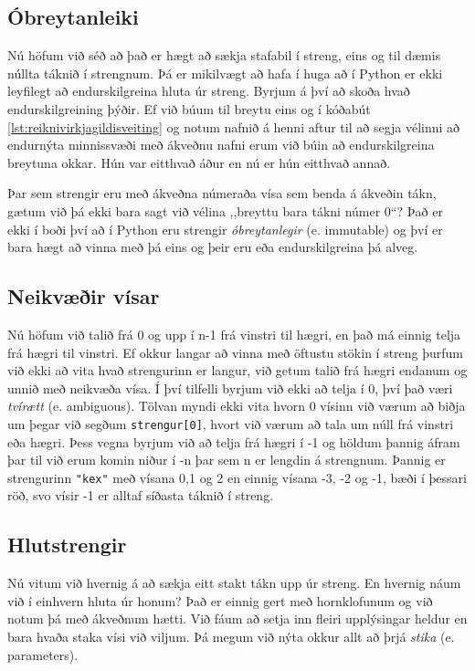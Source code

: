 \subsection{Óbreytanleiki}\label{uk:strengir-obreytanleiki}
Nú höfum við séð að það er hægt að sækja stafabil í streng, eins og til dæmis núllta táknið í strengnum.
Þá er mikilvægt að hafa í huga að í Python er ekki leyfilegt að endurskilgreina hluta úr streng.
Byrjum á því að skoða hvað endurskilgreining þýðir.
Ef við búum til breytu eins og í kóðabút \ref{lst:reiknivirkjagildisveiting} og notum nafnið á henni aftur til að segja vélinni að endurnýta minnissvæði með ákveðnu nafni erum við búin að endurskilgreina breytuna okkar.
Hún var eitthvað áður en nú er hún eitthvað annað.

Þar sem strengir eru með ákveðna númeraða vísa sem benda á ákveðin tákn, gætum við þá ekki bara sagt við vélina ,,breyttu bara tákni númer 0“?
Það er ekki í boði því að í Python eru strengir \emph{óbreytanlegir} (e. immutable) og því er bara hægt að vinna með þá eins og þeir eru eða endurskilgreina þá alveg.

\subsection{Neikvæðir vísar}
Nú höfum við talið frá 0 og upp í n-1 frá vinstri til hægri, en það má einnig telja frá hægri til vinstri.
Ef okkur langar að vinna með öftustu stökin í streng þurfum við ekki að vita hvað strengurinn er langur, við getum talið frá hægri endanum og unnið með neikvæða vísa.
Í því tilfelli byrjum við ekki að telja í 0, því það væri \emph{tvírætt} (e. ambiguous).
Tölvan myndi ekki vita hvorn 0 vísinn við værum að biðja um þegar við segðum \texttt{strengur[0]}, hvort við værum að tala um núll frá vinstri eða hægri.
Þess vegna byrjum við að telja frá hægri í -1 og höldum þannig áfram þar til við erum komin niður í -n þar sem n er lengdin á strengnum.
Þannig er strengurinn \texttt{"kex"} með vísana 0,1 og 2 en einnig vísana -3, -2 og -1, bæði í þessari röð, svo vísir -1 er alltaf síðasta táknið í streng.

\subsection{Hlutstrengir}
Nú vitum við hvernig á að sækja eitt stakt tákn upp úr streng.
En hvernig náum við í einhvern hluta úr honum?
Það er einnig gert með hornklofunum og við notum þá með ákveðnum hætti.
Við fáum að setja inn fleiri upplýsingar heldur en bara hvaða staka vísi við viljum.
Þá megum við nýta okkur allt að þrjá \emph{stika} (e. parameters).

